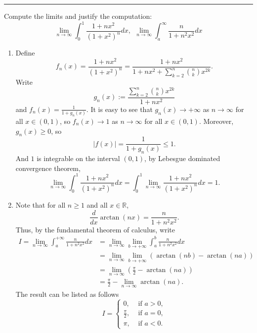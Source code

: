 \documentclass[letterpaper, 12pt]{article}
\begin{document}
\noindent\rule{7in}{2.8pt}
\begin{problem}{3.2}
Compute the limits and justify the computation:
\[\lim_{n\to \infty}\int_{0}^{1}\frac{1+nx^2}{(1+x^2)^n}dx,\ \ \lim_{n\to \infty}\int_{a}^{\infty}\frac{n}{1+n^2x^2}dx\]
\end{problem}
\begin{solution}
\begin{enumerate}[(1)]
  \item Define
  \[f_n(x)=\frac{1+nx^2}{(1+x^2)^n}=\frac{1+nx^2}{1+nx^2+\sum_{k=2}^{n}\binom{n}{k}x^{2k}}.\]
  Write 
  \[g_n(x):=\frac{\sum_{k=2}^{n}\binom{n}{k}x^{2k}}{1+nx^2}\]
  and \(f_n(x)=\frac{1}{1+g_n(x)}\). It is easy to see that \(g_n(x)\to +\infty\) as \(n\to \infty\) for all \(x\in (0,1)\), so \(f_n(x)\to 1\) as \(n\to \infty\) for all \(x\in (0,1)\). Moreover, \(g_n(x)\geq 0\), so 
  \[|f(x)|=\frac{1}{1+g_n(x)}\leq 1.\]
  And \(1\) is integrable on the interval \((0,1)\), by Lebesgue dominated convergence theorem, 
  \[\lim_{n\to \infty}\int_0^1 \frac{1+nx^2}{(1+x^2)^n}dx=\int_0^1\lim_{n\to \infty}\frac{1+nx^2}{(1+x^2)^n}dx=1.\]
  \item Note that for all \(n\geq 1\) and all \(x\in \mathbb{R}\), 
  \[\frac{d}{dx}\arctan(nx)=\frac{n}{1+n^2x^2}.\]
  Thus, by the fundamental theorem of calculus, write 
  \begin{align*}
      I=\lim_{n\to \infty}\int_a^{+\infty} \frac{n}{1+n^2x^2}dx&=\lim_{n\to \infty}\lim_{b\to +\infty}\int^b_a \frac{n}{1+n^2x^2}dx\\ 
       &=\lim_{n\to \infty}\lim_{b\to +\infty}(\arctan(nb)-\arctan(na))\\ 
       &=\lim_{n\to \infty}(\frac{\pi}{2}-\arctan(na))\\
       &=\frac{\pi}{2}-\lim_{n\to \infty}\arctan(na).
  \end{align*}
  The result can be listed as follows 
  \[I=\begin{cases}
    0, &\text{ if \(a>0\)},\\
    \frac{\pi}{2}, &\text{ if \(a=0\)},\\
    \pi, &\text{ if \(a<0\)}.
  \end{cases}\]
\end{enumerate}
\end{solution}
\end{document}
